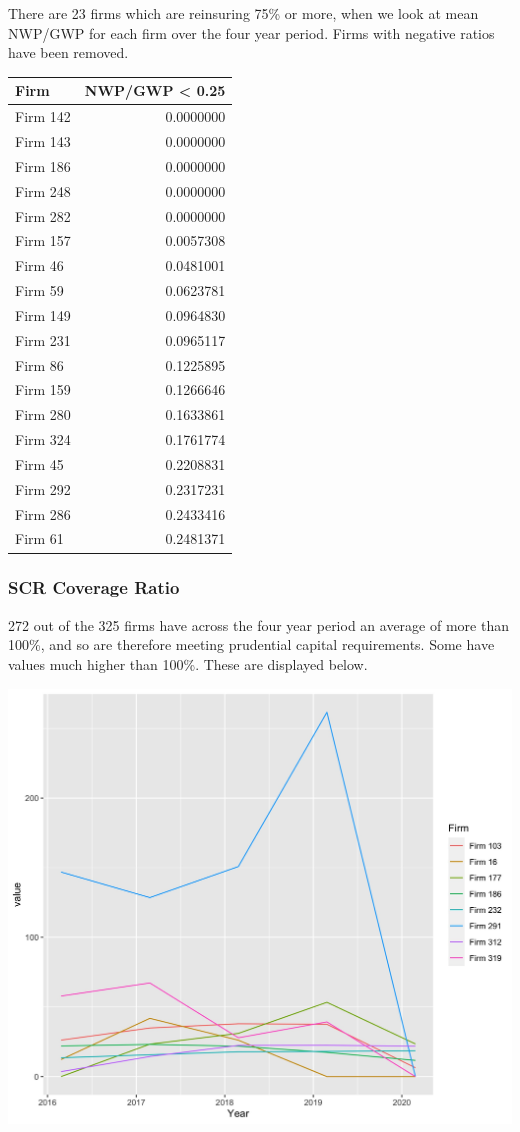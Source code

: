 \documentclass[
]{article}
\begin{document}
There are 23 firms which are reinsuring 75\% or more, when we look at
mean NWP/GWP for each firm over the four year period. Firms with
negative ratios have been removed.

\begin{longtable}[]{@{}lr@{}}
\toprule
Firm & NWP/GWP \textless{} 0.25\tabularnewline
\midrule
\endhead
Firm 142 & 0.0000000\tabularnewline
Firm 143 & 0.0000000\tabularnewline
Firm 186 & 0.0000000\tabularnewline
Firm 248 & 0.0000000\tabularnewline
Firm 282 & 0.0000000\tabularnewline
Firm 157 & 0.0057308\tabularnewline
Firm 46 & 0.0481001\tabularnewline
Firm 59 & 0.0623781\tabularnewline
Firm 149 & 0.0964830\tabularnewline
Firm 231 & 0.0965117\tabularnewline
Firm 86 & 0.1225895\tabularnewline
Firm 159 & 0.1266646\tabularnewline
Firm 280 & 0.1633861\tabularnewline
Firm 324 & 0.1761774\tabularnewline
Firm 45 & 0.2208831\tabularnewline
Firm 292 & 0.2317231\tabularnewline
Firm 286 & 0.2433416\tabularnewline
Firm 61 & 0.2481371\tabularnewline
\bottomrule
\end{longtable}

\hypertarget{scr-coverage-ratio}{%
\subsubsection{SCR Coverage Ratio}\label{scr-coverage-ratio}}

272 out of the 325 firms have across the four year period an average of
more than 100\%, and so are therefore meeting prudential capital
requirements. Some have values much higher than 100\%. These are
displayed below.

\includegraphics[width=1\linewidth]{../figs/high_scr_plot}
\end{document}

